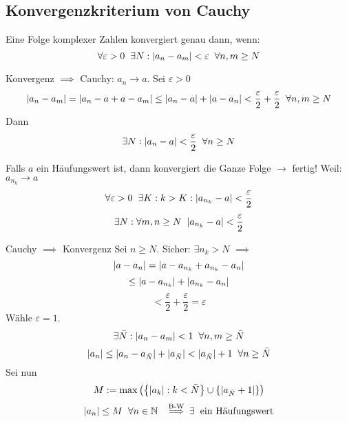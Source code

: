 \subsection{Konvergenzkriterium von Cauchy}
\begin{Sat}
  Eine Folge komplexer Zahlen konvergiert genau dann, wenn:
  \[\forall \varepsilon>0\hspace{2mm}\exists N:\mathopen| a_n-a_m \mathclose|<\varepsilon\hspace{2mm}\forall n,m\geq N\]
\end{Sat}
\begin{Bew}
  Konvergenz $\implies$ Cauchy: $a_n\to a$. Sei $\varepsilon>0$
  \[\mathopen| a_n-a_m \mathclose|=\mathopen| a_n-a+a-a_m \mathclose|\leq \mathopen| a_n-a \mathclose|+\mathopen| a-a_n \mathclose|<\frac{\varepsilon}{2}+\frac{\varepsilon}{2}\hspace{2mm}\forall n,m\geq N\]
  Dann 
  \[\exists N:\mathopen| a_n-a \mathclose|<\frac{\varepsilon}{2}\hspace{2mm}\forall n\geq N\]
  \begin{Bem}
    Falls $a$ ein Häufungswert ist, dann konvergiert die Ganze Folge $\to$ fertig! Weil: $a_{n_k}\to a$
    \[\forall \varepsilon>0\hspace{2mm}\exists K:k>K:\mathopen| a_{n_k}-a \mathclose|<\frac{\varepsilon}{2}\]
    \[\exists N:\forall m,n\geq N\hspace{2mm} \mathopen| a_{n_k}-a \mathclose|<\frac{\varepsilon}{2}\]
  \end{Bem}
  Cauchy $\implies$ Konvergenz
  Sei $n\geq N$. Sicher: $\exists n_k>N$ $\implies$
  \[\mathopen| a-a_n \mathclose|=\mathopen| a-a_{n_k}+a_{n_k}-a_n \mathclose|\]
  \[\leq\mathopen| a-a_{n_k} \mathclose|+\mathopen| a_{n_k}-a_n \mathclose|\]
  \[<\frac{\varepsilon}{2}+\frac{\varepsilon}{2}=\varepsilon\]
  Wähle $\varepsilon=1$. 
  \[\exists \bar N:\mathopen| a_n-a_m \mathclose|<1\hspace{2mm}\forall n,m\geq \bar N\]
  \[\mathopen| a_n \mathclose|\leq \mathopen| a_n-a_{\bar N} \mathclose|+\mathopen| a_{\bar N} \mathclose|<\mathopen| a_{\bar N} \mathclose|+1\hspace{2mm}\forall n\geq \bar N\]
  Sei nun
  \[M:=\max\left( \left\{ \mathopen| a_k \mathclose|:k<\bar N \right\}\cup\left\{ \mathopen| a_{\bar N}+1 \mathclose| \right\} \right)\]
  \[\mathopen| a_n \mathclose|\leq M\hspace{2mm}\forall n\in\mathbb{N}\hspace{2mm}\stackrel{\text{B-W}}{\implies} \exists\hspace{2mm}\text{ein Häufungswert}\]
\end{Bew}
